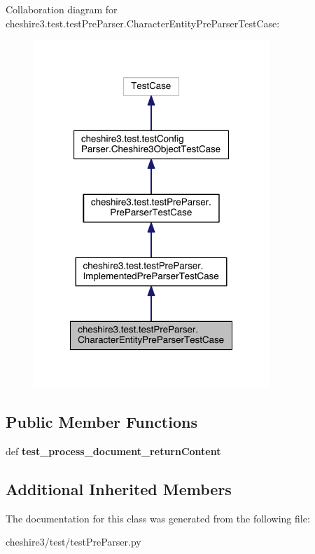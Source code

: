 Collaboration diagram for cheshire3.\-test.\-test\-Pre\-Parser.\-Character\-Entity\-Pre\-Parser\-Test\-Case\-:
\nopagebreak
\begin{figure}[H]
\begin{center}
\leavevmode
\includegraphics[width=252pt]{classcheshire3_1_1test_1_1test_pre_parser_1_1_character_entity_pre_parser_test_case__coll__graph}
\end{center}
\end{figure}
\subsection*{Public Member Functions}
\begin{DoxyCompactItemize}
\item 
\hypertarget{classcheshire3_1_1test_1_1test_pre_parser_1_1_character_entity_pre_parser_test_case_a343d77226caee34ac2fa4a2779f4a259}{def {\bfseries test\-\_\-process\-\_\-document\-\_\-return\-Content}}\label{classcheshire3_1_1test_1_1test_pre_parser_1_1_character_entity_pre_parser_test_case_a343d77226caee34ac2fa4a2779f4a259}

\end{DoxyCompactItemize}
\subsection*{Additional Inherited Members}


The documentation for this class was generated from the following file\-:\begin{DoxyCompactItemize}
\item 
cheshire3/test/test\-Pre\-Parser.\-py\end{DoxyCompactItemize}
